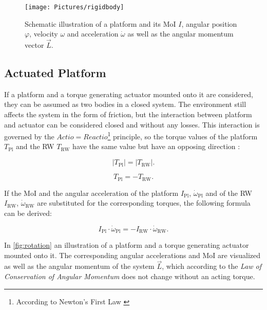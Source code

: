 \begin{figure}[H]
{\centering
\texttt{[image: Pictures/rigidbody]}
\caption{Schematic illustration of a platform and its MoI $I$, angular position $\varphi$, velocity $\omega$ and acceleration $\dot{\omega}$ as well as the angular momentum vector $\vec{L}$.}
\label{fig:rigidbody}
}
\end{figure}




\subsection{Actuated Platform}
\label{sec:actuatedplatform}
If a platform and a torque generating actuator mounted onto it are considered, they can be assumed as two bodies in a closed system. The environment still affects the system in the form of friction, but the interaction between platform and actuator can be considered closed and without any losses. This interaction is governed by the $Actio=Reactio$\footnote{According to Newton's First Law \cite{Demtroder.2017}} principle, so the torque values of the platform $T_\text{Pl}$ and the RW $T_\text{RW}$ have the same value but have an opposing direction  \cite{Karaoglu.2020}:


\begin{equation}
|T_\text{Pl}| = |T_\text{RW}| .
\label{eqn:torque1}
\end{equation}

\begin{equation}
T_\text{Pl} = - T_\text{RW} .
\label{eqn:torque2}
\end{equation}

If the MoI and the angular acceleration of the platform $I_\text{Pl}$, $\dot{\omega}_\text{Pl}$ and of the RW $I_\text{RW}$, $\dot{\omega}_\text{RW}$ are substituted for the corresponding torques, the following formula can be derived:

\begin{equation}
I_\text{Pl} \cdot \dot{\omega}_\text{Pl} = - I_\text{RW} \cdot \dot{\omega}_\text{RW} .
\label{eqn:torque3}
\end{equation}


In \autoref{fig:rotation} an illustration of a platform and a torque generating actuator mounted onto it. The corresponding angular accelerations and MoI are visualized as well as the angular momentum of the system $\vec{L}$, which according to the \textit{Law of Conservation of Angular Momentum} does not change without an acting torque. 



